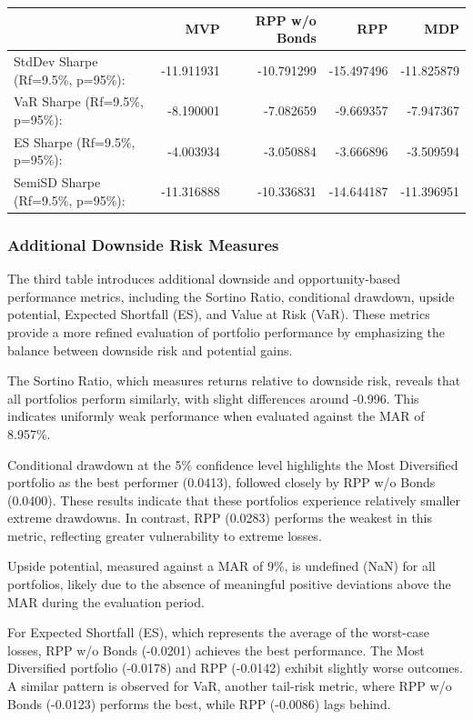 \documentclass[11pt,preprint]{elsarticle}
\let\origtable\table
\let\endorigtable\endtable
\renewenvironment{table}[1][2] {
    \expandafter\origtable\expandafter[H]
} {
    \endorigtable
}
\numberwithin{equation}{section}
\numberwithin{figure}{section}
\numberwithin{table}{section}
\begin{document}
\begin{table}
\centering
\caption{\label{tab:sharpe-ratios}Sharpe Ratios}
\centering
\begin{tabular}[t]{l|r|r|r|r}
\hline
  & MVP & RPP w/o Bonds & RPP & MDP\\
\hline
StdDev Sharpe (Rf=9.5\%, p=95\%): & -11.911931 & -10.791299 & -15.497496 & -11.825879\\
\hline
VaR Sharpe (Rf=9.5\%, p=95\%): & -8.190001 & -7.082659 & -9.669357 & -7.947367\\
\hline
ES Sharpe (Rf=9.5\%, p=95\%): & -4.003934 & -3.050884 & -3.666896 & -3.509594\\
\hline
SemiSD Sharpe (Rf=9.5\%, p=95\%): & -11.316888 & -10.336831 & -14.644187 & -11.396951\\
\hline
\end{tabular}
\end{table}

\subsubsection{Additional Downside Risk
Measures}\label{additional-downside-risk-measures}

The third table introduces additional downside and opportunity-based
performance metrics, including the Sortino Ratio, conditional drawdown,
upside potential, Expected Shortfall (ES), and Value at Risk (VaR).
These metrics provide a more refined evaluation of portfolio performance
by emphasizing the balance between downside risk and potential gains.

The Sortino Ratio, which measures returns relative to downside risk,
reveals that all portfolios perform similarly, with slight differences
around -0.996. This indicates uniformly weak performance when evaluated
against the MAR of 8.957\%.

Conditional drawdown at the 5\% confidence level highlights the Most
Diversified portfolio as the best performer (0.0413), followed closely
by RPP w/o Bonds (0.0400). These results indicate that these portfolios
experience relatively smaller extreme drawdowns. In contrast, RPP
(0.0283) performs the weakest in this metric, reflecting greater
vulnerability to extreme losses.

Upside potential, measured against a MAR of 9\%, is undefined (NaN) for
all portfolios, likely due to the absence of meaningful positive
deviations above the MAR during the evaluation period.

For Expected Shortfall (ES), which represents the average of the
worst-case losses, RPP w/o Bonds (-0.0201) achieves the best
performance. The Most Diversified portfolio (-0.0178) and RPP (-0.0142)
exhibit slightly worse outcomes. A similar pattern is observed for VaR,
another tail-risk metric, where RPP w/o Bonds (-0.0123) performs the
best, while RPP (-0.0086) lags behind.
\end{document}
